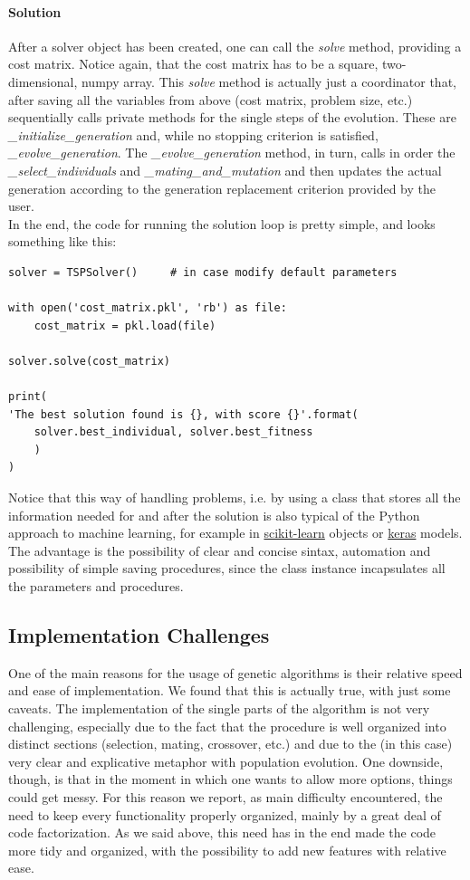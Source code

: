 \documentclass{article}
\begin{document}
\paragraph*{Solution} After a solver object has been created, one can call the \textit{solve} method, providing a cost matrix. Notice again, that the cost matrix has to be a square, two-dimensional, numpy array. This \textit{solve} method is actually just a coordinator that, after saving all the variables from above (cost matrix, problem size, etc.) sequentially calls private methods for the single steps of the evolution. These are \textit{\_initialize\_generation} and, while no stopping criterion is satisfied, \textit{\_evolve\_generation}. The \textit{\_evolve\_generation} method, in turn, calls in order the \textit{\_select\_individuals} and \textit{\_mating\_and\_mutation} and then updates the actual generation according to the generation replacement criterion provided by the user. \\
In the end, the code for running the solution loop is pretty simple, and looks something like this:
\newline
\begin{lstlisting}	
solver = TSPSolver()     # in case modify default parameters

with open('cost_matrix.pkl', 'rb') as file:
	cost_matrix = pkl.load(file)
	
solver.solve(cost_matrix)

print(
'The best solution found is {}, with score {}'.format(
	solver.best_individual, solver.best_fitness
	)
)
\end{lstlisting}
Notice that this way of handling problems, i.e. by using a class that stores all the information needed for and after the solution is also typical of the Python approach to machine learning, for example in \href{https://scikit-learn.org/stable/}{scikit-learn} objects or \href{https://keras.io/}{keras} models. The advantage is the possibility of clear and concise sintax, automation and possibility of simple saving procedures, since the class instance incapsulates all the parameters and procedures.

\subsection{Implementation Challenges}
One of the main reasons for the usage of genetic algorithms is their relative speed and ease of implementation. We found that this is actually true, with just some caveats. The implementation of the single parts of the algorithm is not very challenging, especially due to the fact that the procedure is well organized into distinct sections (selection, mating, crossover, etc.) and due to the (in this case) very clear and explicative metaphor with population evolution. One downside, though, is that in the moment in which one wants to allow more options, things could get messy. For this reason we report, as main difficulty encountered, the need to keep every functionality properly organized, mainly by a great deal of code factorization. As we said above, this need has in the end made the code more tidy and organized, with the possibility to add new features with relative ease.
\end{document}
